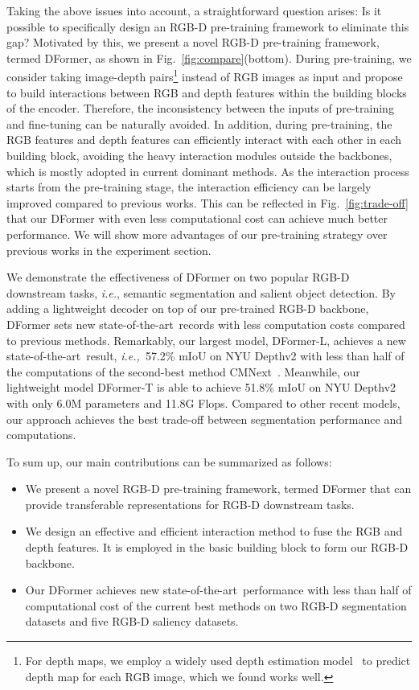 \documentclass{article}
\newcommand{\figref}[1]{Fig.~\ref{#1}}
\newcommand{\sArt}{state-of-the-art~}
\def\ie{\emph{i.e.,~}}
\newcommand{\nMethod}{DFormer}
\begin{document}
Taking the above issues into account, a straightforward question arises: Is it possible to specifically design an RGB-D pre-training framework to eliminate this gap?
Motivated by this, we present a novel RGB-D pre-training framework, termed \nMethod{}, as shown in \figref{fig:compare}(bottom).
During pre-training, we consider taking image-depth pairs\footnote{For depth maps, we employ a widely used depth estimation model~\citep{bhat2021adabins} to predict depth map for each RGB image,
which we found works well.} instead of RGB images as input and propose to build interactions between RGB and depth features within the building blocks of the encoder.
Therefore, the inconsistency between the inputs of pre-training and fine-tuning can be naturally avoided.
In addition, during pre-training, the RGB features and depth features can efficiently interact with each other in each building block, avoiding the heavy interaction modules outside the backbones, which is mostly adopted in
current dominant methods.
As the interaction process starts from the pre-training stage, the interaction efficiency can be largely improved compared to previous works.
This can be reflected in \figref{fig:trade-off} that our \nMethod{} with even less computational cost can achieve much better performance.
We will show more advantages of our pre-training strategy over  previous works in the experiment section.




We demonstrate the effectiveness of \nMethod{} on two popular RGB-D downstream tasks, \emph{i.e.}, semantic segmentation and salient object detection.
By adding a lightweight decoder on top of our pre-trained RGB-D backbone, \nMethod{} sets new \sArt records with less computation costs compared to previous methods. 
Remarkably, our largest model, \nMethod{}-L, achieves a new \sArt result, \ie 57.2\% mIoU on NYU Depthv2 with less than half of the computations of the second-best method CMNext~\citep{zhang2023delivering}.
Meanwhile, our lightweight model \nMethod{}-T is able to achieve 51.8\% mIoU on NYU Depthv2 with only 6.0M parameters and 11.8G Flops. 
Compared to other recent models, our approach achieves the best trade-off between segmentation performance and computations.










To sum up, our main contributions can be summarized as follows:
\begin{itemize}
\item We present a novel RGB-D pre-training framework, termed \nMethod{} that can provide transferable representations for RGB-D downstream tasks.
\item We design an effective and efficient interaction method to fuse the RGB and depth features. It is employed in the basic building block to form our RGB-D backbone.  
\item Our \nMethod{} achieves new \sArt performance with less than half of computational cost of the current best methods on two RGB-D segmentation datasets and five RGB-D saliency datasets.
\end{itemize}
\end{document}
